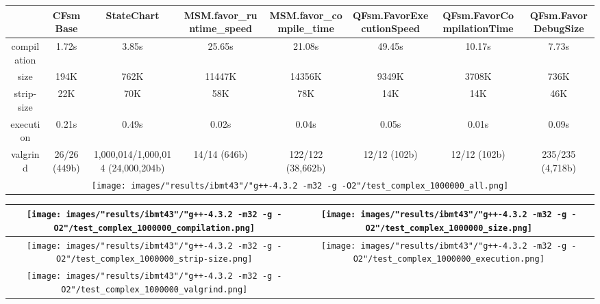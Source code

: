 \begin{landscape}
\begin{table}
\caption{"ibmt43" [df6407d], g++-4.3.2 -m32 -g -O2/test complex 1000000}
\centering
\begin{longtable}{| c | c |c |c |c |c |c |c |}
\hline
& CFsmBase& StateChart& MSM.favor\_runtime\_speed& MSM.favor\_compile\_time& QFsm.FavorExecutionSpeed& QFsm.FavorCompilationTime& QFsm.FavorDebugSize\\
\hline
compilation & 1.72s & 3.85s & 25.65s & 21.08s & 49.45s & 10.17s & 7.73s\\
\hline
size & 194K & 762K & 11447K & 14356K & 9349K & 3708K & 736K\\
\hline
strip-size & 22K & 70K & 58K & 78K & 14K & 14K & 46K\\
\hline
execution & 0.21s & 0.49s & 0.02s & 0.04s & 0.05s & 0.01s & 0.09s\\
\hline
valgrind & 26/26 (449b) & 1,000,014/1,000,014 (24,000,204b) & 14/14 (646b) & 122/122 (38,662b) & 12/12 (102b) & 12/12 (102b) & 235/235 (4,718b)\\
\hline
\multicolumn{8}{|c|}{\texttt{[image: images/"results/ibmt43"/"g++-4.3.2 -m32 -g -O2"/test\_complex\_1000000\_all.png]}}\\
\hline
\end{longtable}
\end{table}
\end{landscape}
\newpage
\begin{table}
\centering
\begin{longtable}{| c | c |}
\hline
\texttt{[image: images/"results/ibmt43"/"g++-4.3.2 -m32 -g -O2"/test\_complex\_1000000\_compilation.png]}& \texttt{[image: images/"results/ibmt43"/"g++-4.3.2 -m32 -g -O2"/test\_complex\_1000000\_size.png]}\\
\hline
\texttt{[image: images/"results/ibmt43"/"g++-4.3.2 -m32 -g -O2"/test\_complex\_1000000\_strip-size.png]}& \texttt{[image: images/"results/ibmt43"/"g++-4.3.2 -m32 -g -O2"/test\_complex\_1000000\_execution.png]}\\
\hline
\texttt{[image: images/"results/ibmt43"/"g++-4.3.2 -m32 -g -O2"/test\_complex\_1000000\_valgrind.png]}& \\ \hline
\end{longtable}
\end{table}
